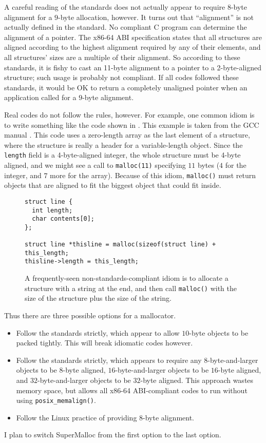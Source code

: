 \documentclass[natbib,sort&compress]{sigplanconf}
\newcommand{\code}[1]{\texttt{#1}}
\begin{document}
A careful reading of the standards \cite{ISOIEC11, MatzHuJa07} does
not actually appear to require $8$-byte alignment for a $9$-byte
allocation, however.  It turns out that ``alignment'' is not actually
defined in the standard.  No compliant C program can determine the
alignment of a pointer.  The x86-64 ABI specification
\cite{MatzHuJa07} states that all structures are aligned according to
the highest alignment required by any of their elements, and all
structures' sizes are a multiple of their alignment.  So according to
these standards, it is fishy to cast an 11-byte alignment to a pointer
to a 2-byte-aligned structure; such usage is probably not compliant.
If all codes followed these standards, it would be OK to return a
completely unaligned pointer when an application called for a $9$-byte
alignment.

Real codes do not follow the rules, however.  For example, one common
idiom is to write something like the code shown in .
This example is taken from the GCC manual \cite{GCC14}.  This code
uses a zero-length array as the last element of a structure, where the
structure is really a header for a variable-length object.  Since the
\code{length} field is a 4-byte-aligned integer, the whole structure
must be 4-byte aligned, and we might see a call to \code{malloc(11)}
specifying $11$ bytes ($4$ for the integer, and $7$ more for the array).
Because of this idiom, \code{malloc()} must return objects that are
aligned to fit the biggest object that could fit inside.

\begin{figure}
\begin{verbatim}
struct line {
  int length;
  char contents[0];
};

struct line *thisline = malloc(sizeof(struct line) + this_length;
thisline->length = this_length;
\end{verbatim}
\caption{A frequently-seen non-standards-compliant idiom is to
  allocate a structure with a string at the end, and then call
  \code{malloc()} with the size of the structure plus the size of the
  string.}
\label{fig:idiom}
\end{figure}

Thus there are three possible options for a mallocator.
\begin{itemize}
\item Follow the standards strictly, which appear to allow $10$-byte
  objects to be packed tightly.  This will break idiomatic codes
  however.
\item Follow the standards strictly, which appears to require any
  $8$-byte-and-larger objects to be $8$-byte aligned,
  $16$-byte-and-larger objects to be $16$-byte aligned, and 
  $32$-byte-and-larger objects to be $32$-byte aligned.  This approach
  wastes memory space, but allows all x86-64 ABI-compliant codes to
  run without using \code{posix_memalign()}.
\item Follow the Linux practice of providing 8-byte alignment.
\end{itemize}
I plan to switch SuperMalloc from the first option to the last option.
\end{document}
